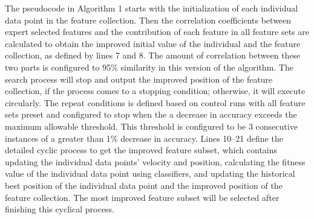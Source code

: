 \documentclass[12pt]{report}
\begin{document}
The pseudocode in Algorithm 1 starts with the initialization of each individual data point in the feature collection.  Then the correlation coefficients between expert selected features and the contribution of each feature in all feature sets are calculated to obtain the improved initial value of the individual and the feature collection, as defined by lines 7 and 8.  The amount of correlation between these two parts is configured to 95\% similarity in this version of the algorithm.  The search process will stop and output the improved position of the feature collection, if the process comes to a stopping condition; otherwise, it will execute circularly.  The repeat conditions is defined based on control runs with all feature sets preset and configured to stop when the a decrease in accuracy exceeds the maximum allowable threshold.  This threshold is configured to be 3 consecutive instances of a greater than 1\% decrease in accuracy.  Lines 10–21 define the detailed cyclic process to get the improved feature subset, which contains updating the individual data points’ velocity and position, calculating the fitness value of the individual data point using classifiers, and updating the historical best position of the individual data point and the improved position of the feature collection.  The most improved feature subset will be selected after finishing this cyclical process.

\end{document}
